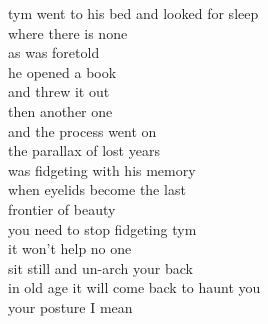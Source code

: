 tym went to his bed and looked for sleep\\
where there is none\\
as was foretold\\
he opened a book\\
and threw it out\\

then another one\\
and the process went on\\
the parallax of lost years\\
was fidgeting with his memory\\
when eyelids become the last\\
frontier of beauty\\

you need to stop fidgeting tym\\
it won't help no one\\
sit still and un-arch your back\\
in old age it will come back to haunt you\\
your posture I mean
